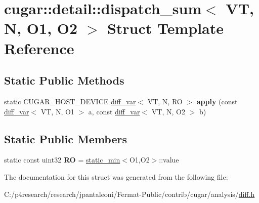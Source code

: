 \hypertarget{structcugar_1_1detail_1_1dispatch__sum}{}\section{cugar\+:\+:detail\+:\+:dispatch\+\_\+sum$<$ VT, N, O1, O2 $>$ Struct Template Reference}
\label{structcugar_1_1detail_1_1dispatch__sum}
\subsection*{Static Public Methods}
\begin{DoxyCompactItemize}
\item 
\mbox{\label{structcugar_1_1detail_1_1dispatch__sum_ac33220536353aa59a16478175eaaf0f5}} 
static C\+U\+G\+A\+R\+\_\+\+H\+O\+S\+T\+\_\+\+D\+E\+V\+I\+CE \hyperlink{structcugar_1_1diff__var}{diff\+\_\+var}$<$ VT, N, RO $>$ {\bfseries apply} (const \hyperlink{structcugar_1_1diff__var}{diff\+\_\+var}$<$ VT, N, O1 $>$ a, const \hyperlink{structcugar_1_1diff__var}{diff\+\_\+var}$<$ VT, N, O2 $>$ b)
\end{DoxyCompactItemize}
\subsection*{Static Public Members}
\begin{DoxyCompactItemize}
\item 
\mbox{\label{structcugar_1_1detail_1_1dispatch__sum_a34d1428dc373b760e3cfa81404b60432}} 
static const uint32 {\bfseries RO} = \hyperlink{structcugar_1_1static__min}{static\+\_\+min}$<$O1,O2$>$\+::value
\end{DoxyCompactItemize}


The documentation for this struct was generated from the following file\+:\begin{DoxyCompactItemize}
\item 
C\+:/p4research/research/jpantaleoni/\+Fermat-\/\+Public/contrib/cugar/analysis/\hyperlink{diff_8h}{diff.\+h}\end{DoxyCompactItemize}
